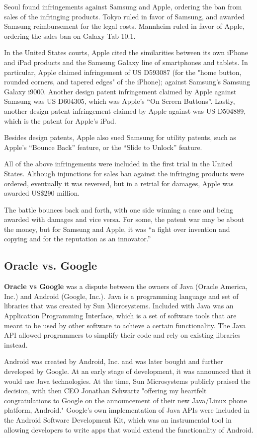 \documentclass[prodmode,cs196]{acmlarge}
\begin{document}
Seoul found infringements against Samsung and Apple, ordering the ban from sales of the infringing products. Tokyo ruled in favor of Samsung, and awarded Samsung reimbursement for the legal costs. Mannheim ruled in favor of Apple, ordering the sales ban on Galaxy Tab 10.1.

In the United States courts, Apple cited the similarities between its own iPhone and iPad products and the Samsung Galaxy line of smartphones and tablets. In particular, Apple claimed infringement of US D593087 (for the "home button, rounded corners, and tapered edges" of the iPhone); \cite{AppleiPhoneDesignPatent} against Samsung’s Samsung Galaxy i9000. Another design patent infringement claimed by Apple against Samsung was US D604305, which was Apple’s “On Screen Buttons”. Lastly, another design patent infringement claimed by Apple against was US D504889, which is the patent for Apple’s iPad.

Besides design patents, Apple also sued Samsung for utility patents, such as Apple’s “Bounce Back” feature, or the “Slide to Unlock” feature.

All of the above infringements were included in the first trial in the United States. Although injunctions for sales ban against the infringing products were ordered, eventually it was reversed, but in a retrial for damages, Apple was awarded US\$290 million.

The battle bounces back and forth, with one side winning a case and being awarded with damages and vice versa. For some, the patent war may be about the money, but for Samsung and Apple, it was “a fight over invention and copying and for the reputation as an innovator.” \cite{CNet}

\subsection{Oracle vs. Google}

\textbf{Oracle vs Google} was a dispute between the owners of Java (Oracle America, Inc.) and Android (Google, Inc.). Java is a programming language and set of libraries that was created by Sun Microsystems. Included with Java was an Application Programming Interface, which is a set of software tools that are meant to be used by other software to achieve a certain functionality. \cite{Sintes2001} The Java API allowed programmers to simplify their code and rely on existing libraries instead.

Android was created by Android, Inc. and was later bought and further developed by Google. At an early stage of development, it was announced that it would use Java technologies. At the time, Sun Microsystems publicly praised the decision, with then CEO Jonathan Schwartz "offering my heartfelt congratulations to Google on the announcement of their new Java/Linux phone platform, Android." \cite{Schwartz2007} Google's own implementation of Java APIs were included in the Android Software Development Kit, which was an instrumental tool in allowing developers to write apps that would extend the functionality of Android.
\end{document}
